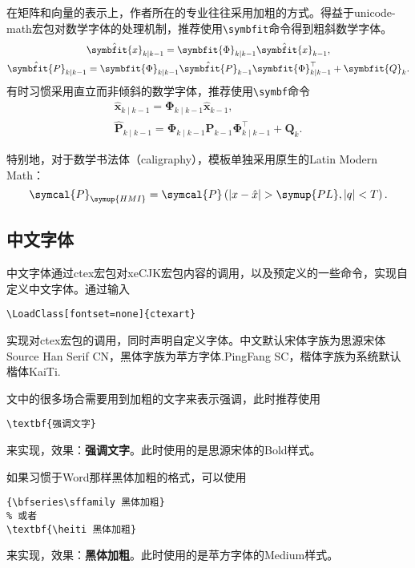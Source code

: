 \documentclass{gunote}
\newcommand{\cmd}[1]{\texttt{\backslash #1}}
\def\mbi{\symbfit}
\def\mbu{\symbf}
\begin{document}
在矩阵和向量的表示上，作者所在的专业往往采用加粗的方式。得益于\textsf{unicode-math}宏包对数学字体的处理机制，推荐使用\cmd{symbfit}命令得到粗斜数学字体。
\begin{gather}
  \hat{\mbi{x}}_{k\mid k-1}=\mbi{\Phi}_{k\mid k-1}\hat{\mbi{x}}_{k-1},\\
  \hat{\mbi{P}}_{k\mid k-1}=\mbi{\Phi}_{k\mid k-1}\hat{\mbi{P}}_{k-1}\mbi{\Phi}_{k\mid k-1}^\top+\mbi{Q}_k.
\end{gather}
有时习惯采用直立而非倾斜的数学字体，推荐使用\cmd{symbf}命令
\begin{gather}
  \hat{\mbu{x}}_{k\mid k-1}=\mbu{\Phi}_{k\mid k-1}\hat{\mbu{x}}_{k-1},\\
  \hat{\mbu{P}}_{k\mid k-1}=\mbu{\Phi}_{k\mid k-1}\hat{\mbu{P}}_{k-1}\mbu{\Phi}_{k\mid k-1}^\top+\mbu{Q}_k.
\end{gather}

特别地，对于数学书法体（caligraphy），模板单独采用原生的Latin Modern Math：
\begin{equation}
  \symcal{P}_{\symup{HMI}}=\symcal{P}\left(\vert x-\hat{x}\vert>\symup{PL},\vert q\vert<T\right).
\end{equation}
\subsection{中文字体}
中文字体通过\textsf{ctex}宏包对\textsf{xeCJK}宏包内容的调用，以及预定义的一些命令，实现自定义中文字体。通过输入
\begin{verbatim}
\LoadClass[fontset=none]{ctexart}
\end{verbatim}
实现对\textsf{ctex}宏包的调用，同时声明自定义字体。中文默认宋体字族为思源宋体Source Han Serif CN，黑体字族为苹方字体.PingFang SC，楷体字族为系统默认楷体KaiTi.

文中的很多场合需要用到加粗的文字来表示强调，此时推荐使用
\begin{verbatim}
\textbf{强调文字}
\end{verbatim}
来实现，效果：\textbf{强调文字}。此时使用的是思源宋体的Bold样式。

如果习惯于Word那样黑体加粗的格式，可以使用
\begin{verbatim}
{\bfseries\sffamily 黑体加粗}
% 或者
\textbf{\heiti 黑体加粗}
\end{verbatim}
来实现，效果：{\bfseries\sffamily 黑体加粗}。此时使用的是苹方字体的Medium样式。
\end{document}

